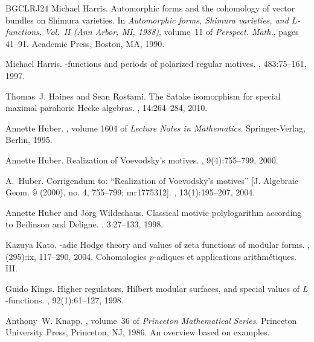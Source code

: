 \documentclass[11pt, a4paper]{amsart}
\theoremstyle{plain}
\theoremstyle{definition}
\numberwithin{equation}{section}
\begin{document}
\begin{thebibliography}{BGCLRJ24}
Michael Harris.
\newblock Automorphic forms and the cohomology of vector bundles on {S}himura
  varieties.
\newblock In {\em Automorphic forms, {S}himura varieties, and {$L$}-functions,
  {V}ol.\ {II} ({A}nn {A}rbor, {MI}, 1988)}, volume~11 of {\em Perspect.
  Math.}, pages 41--91. Academic Press, Boston, MA, 1990.

Michael Harris.
-functions and periods of polarized regular motives.
, 483:75--161, 1997.

Thomas~J. Haines and Sean Rostami.
\newblock The {S}atake isomorphism for special maximal parahoric {H}ecke
  algebras.
, 14:264--284, 2010.

Annette Huber.
,
  volume 1604 of {\em Lecture Notes in Mathematics}.
\newblock Springer-Verlag, Berlin, 1995.

Annette Huber.
\newblock Realization of {V}oevodsky's motives.
, 9(4):755--799, 2000.

A.~Huber.
\newblock Corrigendum to: ``{R}ealization of {V}oevodsky's motives'' [{J}.
  {A}lgebraic {G}eom. ${\mathbb 9}$ (2000), no. 4, 755--799; mr1775312].
, 13(1):195--207, 2004.

Annette Huber and J\"{o}rg Wildeshaus.
\newblock Classical motivic polylogarithm according to {B}eilinson and
  {D}eligne.
, 3:27--133, 1998.

Kazuya Kato.
-adic {H}odge theory and values of zeta functions of modular
  forms.
, (295):ix, 117--290, 2004.
\newblock Cohomologies $p$-adiques et applications arithm\'{e}tiques. III.

Guido Kings.
\newblock Higher regulators, {H}ilbert modular surfaces, and special values of
  {$L$}-functions.
, 92(1):61--127, 1998.

Anthony~W. Knapp.
, volume~36 of {\em
  Princeton Mathematical Series}.
\newblock Princeton University Press, Princeton, NJ, 1986.
\newblock An overview based on examples.


\end{thebibliography}
\end{document}
